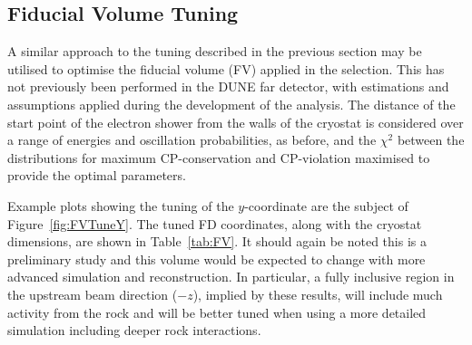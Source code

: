 \subsection{Fiducial Volume Tuning}\label{sec:FDCutFV}

A similar approach to the tuning described in the previous section may be utilised to optimise the fiducial volume (FV) applied in the selection.  This has not previously been performed in the DUNE far detector, with estimations and assumptions applied during the development of the analysis.  The distance of the start point of the electron shower from the walls of the cryostat is considered over a range of energies and oscillation probabilities, as before, and the $\chi^2$ between the distributions for maximum CP-conservation and CP-violation maximised to provide the optimal parameters.

Example plots showing the tuning of the $y$-coordinate are the subject of Figure~\ref{fig:FVTuneY}.  The tuned FD coordinates, along with the cryostat dimensions, are shown in Table~\ref{tab:FV}.  It should again be noted this is a preliminary study and this volume would be expected to change with more advanced simulation and reconstruction.  In particular, a fully inclusive region in the upstream beam direction ($-z$), implied by these results, will include much activity from the rock and will be better tuned when using a more detailed simulation including deeper rock interactions.


